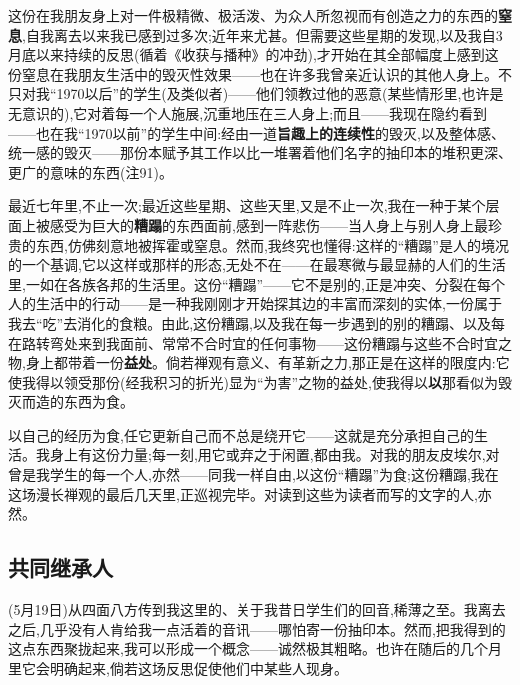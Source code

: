 这份在我朋友身上对一件极精微、极活泼、为众人所忽视而有创造之力的东西的\textbf{窒息},自我离去以来我已感到过多次;近年来尤甚。但需要这些星期的发现,以及我自3月底以来持续的反思(循着《收获与播种》的冲劲),才开始在其全部幅度上感到这份窒息在我朋友生活中的毁灭性效果——也在许多我曾亲近认识的其他人身上。不只对我“1970以后”的学生(及类似者)——他们领教过他的恶意(某些情形里,也许是无意识的),它对着每一个人施展,沉重地压在三人身上;而且——我现在隐约看到——也在我“1970以前”的学生中间:经由一道\textbf{旨趣上的连续性}的毁灭,以及整体感、统一感的毁灭——那份本赋予其工作以比一堆署着他们名字的抽印本的堆积更深、更广的意味的东西(注91)。

最近七年里,不止一次;最近这些星期、这些天里,又是不止一次,我在一种于某个层面上被感受为巨大的\textbf{糟蹋}的东西面前,感到一阵悲伤——当人身上与别人身上最珍贵的东西,仿佛刻意地被挥霍或窒息。然而,我终究也懂得:这样的“糟蹋”是人的境况的一个基调,它以这样或那样的形态,无处不在——在最寒微与最显赫的人们的生活里,一如在各族各邦的生活里。这份“糟蹋”——它不是别的,正是冲突、分裂在每个人的生活中的行动——是一种我刚刚才开始探其边的丰富而深刻的实体,一份属于我去“吃”去消化的食粮。由此,这份糟蹋,以及我在每一步遇到的别的糟蹋、以及每在路转弯处来到我面前、常常不合时宜的任何事物——这份糟蹋与这些不合时宜之物,身上都带着一份\textbf{益处}。倘若禅观有意义、有革新之力,那正是在这样的限度内:它使我得以领受那份(经我积习的折光)显为“为害”之物的益处,使我得以\textbf{以}那看似为毁灭而造的东西为食。

以自己的经历为食,任它更新自己而不总是绕开它——这就是充分承担自己的生活。我身上有这份力量;每一刻,用它或弃之于闲置,都由我。对我的朋友皮埃尔,对曾是我学生的每一个人,亦然——同我一样自由,以这份“糟蹋”为食;这份糟蹋,我在这场漫长禅观的最后几天里,正巡视完毕。对读到这些为读者而写的文字的人,亦然。

\subsection{共同继承人}


\dmark{}(5月19日)从四面八方传到我这里的、关于我昔日学生们的回音,稀薄之至。我离去之后,几乎没有人肯给我一点活着的音讯——哪怕寄一份抽印本。然而,把我得到的这点东西聚拢起来,我可以形成一个概念——诚然极其粗略。也许在随后的几个月里它会明确起来,倘若这场反思促使他们中某些人现身。

